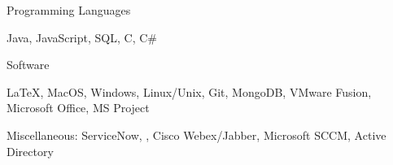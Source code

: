 \begin{cventries}
  \cventry
    {Programming Languages}
    { }
    { }
    { }
    {
      \begin{cvitems}
        \item {Java, JavaScript, SQL, C, C\#}
      \end{cvitems}
    }
  \cventry
    {Software}
    { }
    { }
    { }
    {
      \begin{cvitems}
        \item {LaTeX, MacOS, Windows, Linux/Unix, Git, MongoDB, VMware Fusion, Microsoft Office, MS Project}
        \item {Miscellaneous: ServiceNow, , Cisco Webex/Jabber, Microsoft SCCM, Active Directory }
      \end{cvitems}
    }
\end{cventries}
